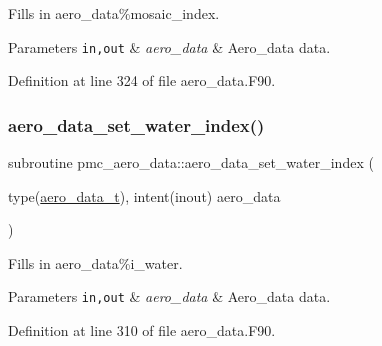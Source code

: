 Fills in aero\+\_\+data\%mosaic\+\_\+index. 


\begin{DoxyParams}[1]{Parameters}
\mbox{\tt in,out}  & {\em aero\+\_\+data} & Aero\+\_\+data data. \\
\hline
\end{DoxyParams}


Definition at line 324 of file aero\+\_\+data.\+F90.

\mbox{\label{namespacepmc__aero__data_afac9815605157d507b8e708731c973c4}} 
\subsubsection{\texorpdfstring{aero\+\_\+data\+\_\+set\+\_\+water\+\_\+index()}{aero\_data\_set\_water\_index()}}
{\footnotesize\ttfamily subroutine pmc\+\_\+aero\+\_\+data\+::aero\+\_\+data\+\_\+set\+\_\+water\+\_\+index (\begin{DoxyParamCaption}\item[{type(\mbox{\hyperlink{structpmc__aero__data_1_1aero__data__t}{aero\+\_\+data\+\_\+t}}), intent(inout)}]{aero\+\_\+data }\end{DoxyParamCaption})}



Fills in aero\+\_\+data\%i\+\_\+water. 


\begin{DoxyParams}[1]{Parameters}
\mbox{\tt in,out}  & {\em aero\+\_\+data} & Aero\+\_\+data data. \\
\hline
\end{DoxyParams}


Definition at line 310 of file aero\+\_\+data.\+F90.

\mbox{\label{namespacepmc__aero__data_a4c9973271c8247581ab4e34fa0c6f0f6}} 
